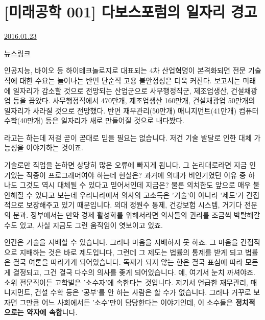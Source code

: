 


\section{[미래공학 001] 다보스포럼의 일자리 경고}
\href{https://www.kockoc.com/Apoc/606699}{2016.01.23}

\vspace{5mm}

\href{http://news.mk.co.kr/newsRead.php?no=51908&year=2016}{뉴스링크}
\vspace{5mm}

인공지능, 바이오 등 하이테크놀로지로 대표되는 4차 산업혁명이 본격화되면 전문 기술직에 대한 수요는 늘어나는 반면 단순직 고용 불안정성은 더욱 커진다. 보고서는 미래에 일자리가 감소할 것으로 전망되는 산업군으로 사무행정직군, 제조업생산, 건설채광업 등을 꼽았다. 사무행정직에서 470만개, 제조업생산 160만개, 건설채광업 50만개의 일자리가 사라질 것으로 전망했다. 반면 재무관리(50만개) 매니지먼트(41만개) 컴퓨터수학(40만개) 등은 일자리가 새로 만들어질 것으로 내다봤다.
\vspace{5mm}

라고는 하는데 저걸 곧이 곧대로 믿을 필요는 없습니다.
저건 기술 발달로 인한 대체 가능성을 이야기하는 것이죠.
\vspace{5mm}

기술로만 직업을 논하면 상당히 많은 오류에 빠지게 됩니다.
그 논리대로라면 지금 인기있는 직종이 프로그래머여야 하는데 현실은?
과거에 의대가 비인기였던 이유 중 하나도 그것도 역시 대체될 수 있다고 믿어서인데 지금은?
물론 의치한도 앞으로 매우 불안해질 수 있다고 보는데
우리나라에서 의사의 고소득은 '기술'이 아니라 '제도'가 간접적으로 보장해주고 있기 때문입니다.
의대 정원수 통제, 건강보험 시스템, 거기다 전문의 분과.
정부에서는 만약 경제 활성화를 위해서라면 의사들의 권리를 조금씩 박탈해갈 수도 있고, 사실 지금도 그런 움직임이 엿보이고 있죠.
\vspace{5mm}

인간은 기술을 지배할 수 있습니다. 그러나 마음을 지배하지 못 하죠.
그 마음을 간접적으로 지배하는 것은 바로 제도입니다, 그런데 그 제도는 법률의 통제를 받게 되고
법률은 결국 여론을 따라가게 되어있습니다.
독재가 되지 않는 한은 결국 표심에 따라 모든 게 결정되고, 그건 결국 다수의 의사를 좆게 되어있습니다.
예, 여기서 눈치 까셔야죠. 소위 전문직이든 고학벌은 '소수자'에 속한다는 것입니다.
저기서 언급한 재무관리, 매니지먼트, 건설 수학 등은 '공부'를 안 하는 사람은 할 수가 없습니다.
그러나 거꾸로 보자면 그만큼 어느 사회에서든 '소수'만이 담당한다는 이야기인데, 이 소수들은 \textbf{정치적으로는 약자에 속합}니다.
\vspace{5mm}

